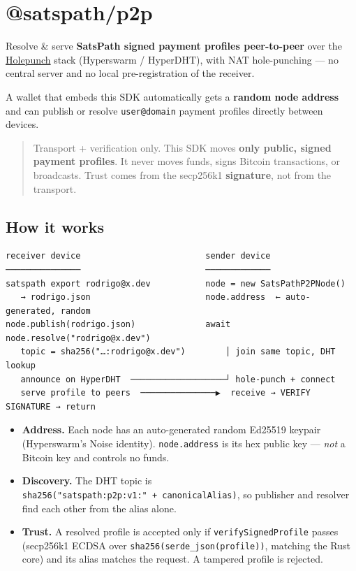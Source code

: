 \documentclass[
]{article}
\author{}
\date{}
\providecommand{\tightlist}{%
  \setlength{\itemsep}{0pt}\setlength{\parskip}{0pt}}
\begin{document}
\hypertarget{satspathp2p}{%
\section{@satspath/p2p}\label{satspathp2p}}

Resolve \& serve \textbf{SatsPath signed payment profiles peer-to-peer}
over the \href{https://holepunch.to}{Holepunch} stack (Hyperswarm /
HyperDHT), with NAT hole-punching --- no central server and no local
pre-registration of the receiver.

A wallet that embeds this SDK automatically gets a \textbf{random node
address} and can publish or resolve \texttt{user@domain} payment
profiles directly between devices.

\begin{quote}
Transport + verification only. This SDK moves \textbf{only public,
signed payment profiles}. It never moves funds, signs Bitcoin
transactions, or broadcasts. Trust comes from the secp256k1
\textbf{signature}, not from the transport.
\end{quote}

\hypertarget{how-it-works}{%
\subsection{How it works}\label{how-it-works}}

\begin{verbatim}
receiver device                         sender device
───────────────                         ─────────────
satspath export rodrigo@x.dev           node = new SatsPathP2PNode()
   → rodrigo.json                       node.address  ← auto-generated, random
node.publish(rodrigo.json)              await node.resolve("rodrigo@x.dev")
   topic = sha256("…:rodrigo@x.dev")        │ join same topic, DHT lookup
   announce on HyperDHT  ───────────────────┘ hole-punch + connect
   serve profile to peers  ───────────────▶  receive → VERIFY SIGNATURE → return
\end{verbatim}

\begin{itemize}
\tightlist
\item
  \textbf{Address.} Each node has an auto-generated random Ed25519
  keypair (Hyperswarm's Noise identity). \texttt{node.address} is its
  hex public key --- \emph{not} a Bitcoin key and controls no funds.
\item
  \textbf{Discovery.} The DHT topic is
  \texttt{sha256("satspath:p2p:v1:"\ +\ canonicalAlias)}, so publisher
  and resolver find each other from the alias alone.
\item
  \textbf{Trust.} A resolved profile is accepted only if
  \texttt{verifySignedProfile} passes (secp256k1 ECDSA over
  \texttt{sha256(serde\_json(profile))}, matching the Rust core) and its
  alias matches the request. A tampered profile is rejected.
\end{itemize}
\end{document}
